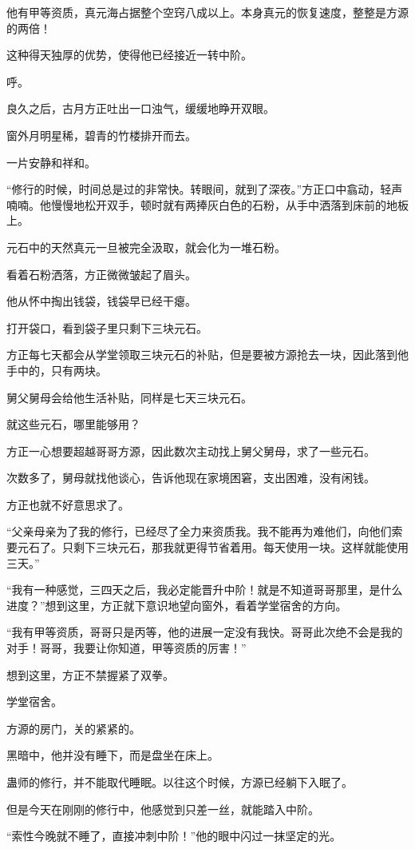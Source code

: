 \begin{this_body}
他有甲等资质，真元海占据整个空窍八成以上。本身真元的恢复速度，整整是方源的两倍！

这种得天独厚的优势，使得他已经接近一转中阶。

呼。

良久之后，古月方正吐出一口浊气，缓缓地睁开双眼。

窗外月明星稀，碧青的竹楼排开而去。

一片安静和祥和。

“修行的时候，时间总是过的非常快。转眼间，就到了深夜。”方正口中翕动，轻声喃喃。他慢慢地松开双手，顿时就有两捧灰白色的石粉，从手中洒落到床前的地板上。

元石中的天然真元一旦被完全汲取，就会化为一堆石粉。

看着石粉洒落，方正微微皱起了眉头。

他从怀中掏出钱袋，钱袋早已经干瘪。

打开袋口，看到袋子里只剩下三块元石。

方正每七天都会从学堂领取三块元石的补贴，但是要被方源抢去一块，因此落到他手中的，只有两块。

舅父舅母会给他生活补贴，同样是七天三块元石。

就这些元石，哪里能够用？

方正一心想要超越哥哥方源，因此数次主动找上舅父舅母，求了一些元石。

次数多了，舅母就找他谈心，告诉他现在家境困窘，支出困难，没有闲钱。

方正也就不好意思求了。

“父亲母亲为了我的修行，已经尽了全力来资质我。我不能再为难他们，向他们索要元石了。只剩下三块元石，那我就更得节省着用。每天使用一块。这样就能使用三天。”

“我有一种感觉，三四天之后，我必定能晋升中阶！就是不知道哥哥那里，是什么进度？”想到这里，方正就下意识地望向窗外，看着学堂宿舍的方向。

“我有甲等资质，哥哥只是丙等，他的进展一定没有我快。哥哥此次绝不会是我的对手！哥哥，我要让你知道，甲等资质的厉害！”

想到这里，方正不禁握紧了双拳。

学堂宿舍。

方源的房门，关的紧紧的。

黑暗中，他并没有睡下，而是盘坐在床上。

蛊师的修行，并不能取代睡眠。以往这个时候，方源已经躺下入眠了。

但是今天在刚刚的修行中，他感觉到只差一丝，就能踏入中阶。

“索性今晚就不睡了，直接冲刺中阶！”他的眼中闪过一抹坚定的光。


\end{this_body}
